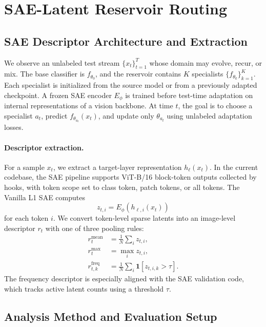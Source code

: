 \documentclass{article}
\begin{document}
\section{SAE-Latent Reservoir Routing}

\subsection{SAE Descriptor Architecture and Extraction}

We observe an unlabeled test stream $\{x_t\}_{t=1}^{T}$ whose domain may evolve, recur, or mix. The base classifier is $f_{\theta_0}$, and the reservoir contains $K$ specialists $\{f_{\theta_k}\}_{k=1}^{K}$. Each specialist is initialized from the source model or from a previously adapted checkpoint. A frozen SAE encoder $E_\phi$ is trained before test-time adaptation on internal representations of a vision backbone. At time $t$, the goal is to choose a specialist $a_t$, predict $f_{\theta_{a_t}}(x_t)$, and update only $\theta_{a_t}$ using unlabeled adaptation losses.

\paragraph{Descriptor extraction.}

For a sample $x_t$, we extract a target-layer representation $h_\ell(x_t)$. In the current codebase, the SAE pipeline supports ViT-B/16 block-token outputs collected by hooks, with token scope set to class token, patch tokens, or all tokens. The Vanilla L1 SAE computes
\begin{equation}
z_{t,i}=E_\phi(h_{\ell,i}(x_t))
\end{equation}
for each token $i$. We convert token-level sparse latents into an image-level descriptor $r_t$ with one of three pooling rules:
\begin{align}
r_t^{\mathrm{mean}} &= \frac{1}{N}\sum_i z_{t,i},\\
r_t^{\mathrm{max}} &= \max_i z_{t,i},\\
r_{t,k}^{\mathrm{freq}} &= \frac{1}{N}\sum_i \mathbf{1}[z_{t,i,k}>\tau].
\end{align}
The frequency descriptor is especially aligned with the SAE validation code, which tracks active latent counts using a threshold $\tau$.

\subsection{Analysis Method and Evaluation Setup}
\end{document}
